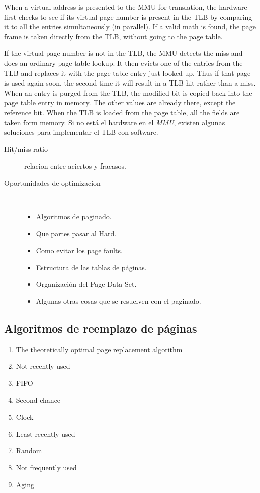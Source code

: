 \documentclass[a4paper, twoside]{article}
\begin{document}
When a virtual address is presented to the MMU for translation, the hardware first checks to see if its virtual page number is present in the TLB by comparing it to all the entries simultaneously (in parallel). If a valid math is found, the page frame is taken directly from the TLB, without going to the page table.

If the virtual page number is not in the TLB, the MMU detects the miss and does an ordinary page table lookup. It then evicts one of the entries from the TLB and replaces it with the page table entry just looked up. Thus if that page is used again soon, the second time it will result in a TLB hit rather than a miss. When an entry is purged from the TLB, the modified bit is copied back into the page table entry in memory. The other values are already there, except the reference bit. When the TLB is loaded from the page table, all the fields are taken form memory.
Si no está el hardware en el \emph{MMU}, existen algunas soluciones para implementar el TLB con software.

\begin{description}
	\item[Hit/miss ratio] relacion entre aciertos y fracasos.
	\item[Oportunidades de optimizacion] ~
	\begin{itemize}
		\item Algoritmos de paginado. 
		\item Que partes pasar al Hard.
		\item Como evitar los page faults.
		\item Estructura de las tablas de páginas.
		\item Organización del Page Data Set.
		\item Algunas otras cosas que se resuelven con el paginado.
	\end{itemize}
\end{description}

\subsection{Algoritmos de reemplazo de páginas}
\begin{enumerate}
	\item The theoretically optimal page replacement algorithm
	\item Not recently used
	\item FIFO
	\item Second-chance
	\item Clock
	\item Least recently used
	\item Random
	\item Not frequently used
	\item Aging
\end{enumerate}
\end{document}
